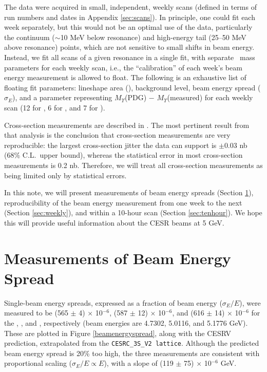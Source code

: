 \documentclass[aps,prd,preprint,superscriptaddress,tightenlines,nofootinbib,floatfix]{revtex4}
\begin{document}
The data were acquired in small, independent, weekly scans (defined in
terms of run numbers and dates in Appendix \ref{sec:scans}).  In
principle, one could fit each week separately, but this would not be
an optimal use of the data, particularly the continuum ($\sim$10 MeV
below resonance) and high-energy tail (25--50 MeV above resonance)
points, which are not sensitive to small shifts in beam energy.
Instead, we fit all scans of a given resonance in a single fit, with
separate \ups\ mass parameters for each weekly scan, i.e., the
``calibration'' of each week's beam energy measurement is allowed to
float.  The following is an exhaustive list of floating fit
parameters: lineshape area (\gee), background level, beam energy
spread ($\sigma_E$), and a parameter representing $M_\Upsilon$(PDG)
$-$ $M_\Upsilon$(measured) for each weekly scan (12 for \uone, 6 for
\utwo, and 7 for \uthree).

Cross-section measurements are described in \cite{me}.  The most
pertinent result from that analysis is the conclusion that
cross-section measurements are very reproducible: the largest
cross-section jitter the data can support is $\pm$0.03 nb (68\% C.L.\
upper bound), whereas the statistical error in most cross-section
measurements is 0.2 nb.  Therefore, we will treat all cross-section
measurements as being limited only by statistical errors.

In this note, we will present measurements of beam energy spreads
(Section \ref{sec:spread}), reproducibility of the beam energy
measurement from one week to the next (Section \ref{sec:weekly}), and
within a 10-hour scan (Section \ref{sec:tenhour}).  We hope this will
provide useful information about the CESR beams at 5 GeV.

\section{Measurements of Beam Energy Spread} \label{sec:spread}

Single-beam energy spreads, expressed as a fraction of beam energy
($\sigma_E/E$), were measured to be (565 $\pm$ 4) $\times$ 10$^{-6}$,
(587 $\pm$ 12) $\times$ 10$^{-6}$, and (616 $\pm$ 14) $\times$
10$^{-6}$ for the \uone, \utwo, and \uthree, respectively (beam
energies are 4.7302, 5.0116, and 5.1776 GeV).  These are plotted in
Figure \ref{beamenergyspread}, along with the CESRV prediction,
extrapolated from the {\tt CESRC\_3S\_V2 lattice}.  Although the
predicted beam energy spread is 20\% too high, the three measurements
are consistent with proportional scaling ($\sigma_E/E \propto E$),
with a slope of (119 $\pm$ 75) $\times$ 10$^{-6}$ GeV\inv.
\end{document}
